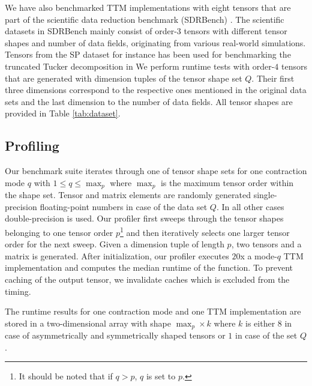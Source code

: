 We have also benchmarked TTM implementations with eight tensors that are part of the scientific data reduction benchmark (SDRBench) \cite{zhao:2020:sdrbench}.
The scientific datasets in SDRBench mainly consist of order-$3$ tensors with different tensor shapes and number of data fields, originating from various real-world simulations.
Tensors from the SP dataset for instance has been used for benchmarking the truncated Tucker decomposition in \cite{ballard:2020:tuckermpi}
We perform runtime tests with order-$4$ tensors that are generated with dimension tuples of the tensor shape set $Q$.
Their first three dimensions correspond to the respective ones mentioned in the original data sets and the last dimension to the number of data fields.
All tensor shapes are provided in Table \ref{tab:dataset}.


\subsection{Profiling} 
Our benchmark suite iterates through one of tensor shape sets for one contraction mode $q$ with $1 \leq q \leq \max_p$ where $\max_p$ is the maximum tensor order within the shape set.
Tensor and matrix elements are randomly generated single-precision floating-point numbers in case of the data set $Q$.
In all other cases double-precision is used.
Our profiler first sweeps through the tensor shapes belonging to one tensor order $p$\footnote{It should be noted that if $q>p$, $q$ is set to $p$.} and then iteratively selects one larger tensor order for the next sweep.
Given a dimension tuple of length $p$, two tensors and a matrix is generated.
After initialization, our profiler executes $20$x a mode-$q$ TTM implementation and computes the median runtime of the function.
To prevent caching of the output tensor, we invalidate caches which is excluded from the timing.
 
The runtime results for one contraction mode and one TTM implementation are stored in a two-dimensional array with shape $\max_p \times k$ where $k$ is either $8$ in case of asymmetrically and symmetrically shaped tensors or $1$ in case of the set $Q$.

